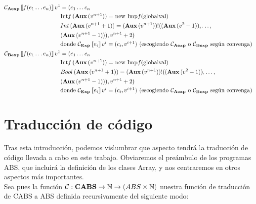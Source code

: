 \begin{align*}
  \mathcal{C}_{\textbf{Aexp}}\left\llbracket f(e_1 \dots e_n) \right\rrbracket v^{1} &= (c_1 \dots c_n\\
  &\mbox{Int$f\,(\textbf{Aux}\, (v^{n+1})) =$ new Imp$f($globalval$)$} \\
  &Int\, (\textbf{Aux}\, (v^{n+1} + 1)) = (\textbf{Aux}\, (v^{n+1}))!((\textbf{Aux}\, (v^{2} - 1)), \dots,\\
  &(\textbf{Aux}\, (v^{n+1} - 1))), v^{n+1} + 2) \\
  &\mbox{donde $\mathcal{C}_{\textbf{Exp}}\left\llbracket e_i \right\rrbracket v^{i} = (c_i, v^{i+1})$ (escogiendo $\mathcal{C}_{\textbf{Aexp}}$ o $\mathcal{C}_{\textbf{Bexp}}$ según convenga)} \\
  \mathcal{C}_{\textbf{Bexp}}\left\llbracket f(e_1 \dots e_n) \right\rrbracket v^{1} &= (c_1 \dots c_n\\
  &\mbox{Int$f\,(\textbf{Aux}\, (v^{n+1})) =$ new Imp$f($globalval$)$} \\
  &Bool\, (\textbf{Aux}\, (v^{n+1} + 1)) = (\textbf{Aux}\, (v^{n+1}))!((\textbf{Aux}\, (v^{2} - 1)), \dots,\\
  &(\textbf{Aux}\, (v^{n+1} - 1))), v^{n+1} + 2) \\
  &\mbox{donde $\mathcal{C}_{\textbf{Exp}}\left\llbracket e_i \right\rrbracket v^{i} = (c_i, v^{i+1})$ (escogiendo $\mathcal{C}_{\textbf{Aexp}}$ o $\mathcal{C}_{\textbf{Bexp}}$ según convenga)} \\
\end{align*}

\section{Traducción de código}

Tras esta introducción, podemos vislumbrar que aspecto tendrá la traducción de código llevada a cabo en este trabajo. Obviaremos el preámbulo de los programas ABS, que incluirá la definición de los clases Array, y nos centraremos en otros aspectos más importantes.\\

Sea pues la función $\mathcal{C}: \textbf{CABS} \rightarrow \mathbb{N} \rightarrow (ABS \times \mathbb{N})$ nuestra función de traducción de CABS a ABS definida recursivamente del siguiente modo:


